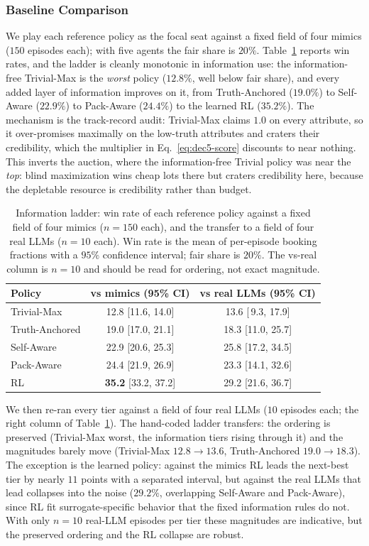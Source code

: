 \subsubsection{Baseline Comparison}
\label{sec:dec5-ladder}
We play each reference policy as the focal seat against a fixed field of four mimics ($150$ episodes each); with five agents the fair share is $20\%$. Table~\ref{tab:dec5_ladder} reports win rates, and the ladder is cleanly monotonic in information use: the information-free Trivial-Max is the \emph{worst} policy ($12.8\%$, well below fair share), and every added layer of information improves on it, from Truth-Anchored ($19.0\%$) to Self-Aware ($22.9\%$) to Pack-Aware ($24.4\%$) to the learned RL ($35.2\%$). The mechanism is the track-record audit: Trivial-Max claims $1.0$ on every attribute, so it over-promises maximally on the low-truth attributes and craters their credibility, which the multiplier in Eq.~\eqref{eq:dec5-score} discounts to near nothing. This inverts the auction, where the information-free Trivial policy was near the \emph{top}: blind maximization wins cheap lots there but craters credibility here, because the depletable resource is credibility rather than budget.

\begin{table}[htbp]
\caption{Information ladder: win rate of each reference policy against a fixed field of four mimics ($n=150$ each), and the transfer to a field of four real LLMs ($n=10$ each). Win rate is the mean of per-episode booking fractions with a $95\%$ confidence interval; fair share is $20\%$. The vs-real column is $n=10$ and should be read for ordering, not exact magnitude.}
\label{tab:dec5_ladder}
\centering
\begin{tabular}{lcc}
\hline
Policy & vs mimics (95\% CI) & vs real LLMs (95\% CI) \\
\hline
Trivial-Max    & 12.8 [11.6, 14.0] & 13.6 [\,9.3, 17.9] \\
Truth-Anchored & 19.0 [17.0, 21.1] & 18.3 [11.0, 25.7] \\
Self-Aware     & 22.9 [20.6, 25.3] & 25.8 [17.2, 34.5] \\
Pack-Aware     & 24.4 [21.9, 26.9] & 23.3 [14.1, 32.6] \\
RL             & \textbf{35.2} [33.2, 37.2] & 29.2 [21.6, 36.7] \\
\hline
\end{tabular}
\end{table}

We then re-ran every tier against a field of four real LLMs ($10$ episodes each; the right column of Table~\ref{tab:dec5_ladder}). The hand-coded ladder transfers: the ordering is preserved (Trivial-Max worst, the information tiers rising through it) and the magnitudes barely move (Trivial-Max $12.8\to13.6$, Truth-Anchored $19.0\to18.3$). The exception is the learned policy: against the mimics RL leads the next-best tier by nearly $11$ points with a separated interval, but against the real LLMs that lead collapses into the noise ($29.2\%$, overlapping Self-Aware and Pack-Aware), since RL fit surrogate-specific behavior that the fixed information rules do not. With only $n=10$ real-LLM episodes per tier these magnitudes are indicative, but the preserved ordering and the RL collapse are robust.

